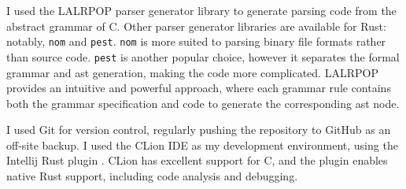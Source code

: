 \documentclass[00-main.tex]{subfiles}
\begin{document}
I used the LALRPOP parser generator library  to generate parsing code from the abstract grammar of C.
Other parser generator libraries are available for Rust: notably, \texttt{nom} and \texttt{pest}.
\texttt{nom} is more suited to parsing binary file formats rather than source code.
\texttt{pest} is another popular choice, however it separates the formal grammar and \gls{ast} generation, making the code more complicated.
LALRPOP provides an intuitive and powerful approach, where each grammar rule contains both the grammar specification and code to generate the corresponding \gls{ast} node.

I used Git  for version control, regularly pushing the repository to GitHub  as an off-site backup.
I used the CLion IDE  as my development environment, using the Intellij Rust plugin .
CLion has excellent support for C, and the plugin enables native Rust support, including code analysis and debugging.
\end{document}
